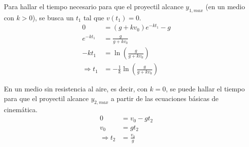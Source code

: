 


\vspace{5 mm}
Para hallar el tiempo necesario para que el proyectil alcance $y_{1,max}$ (en un medio con $k>0$), se busca un $t_{1}$ tal que $v(t_{1})=0$.
\begin{align*}
    0 &= (g+kv_{0})e^{-kt_{1}}-g \\
    e^{-kt_{1}} &= \frac{g}{g+kv_{0}} \\
    -kt_{1} &= \ln \left(\frac{g}{g+kv_{0}}\right) \\
    \Rightarrow t_{1} &= -\frac{1}{k} \ln \left(\frac{g}{g+kv_{0}}\right)
\end{align*}

\vspace{5 mm}
En un medio sin resistencia al aire, es decir, con $k=0$, se puede hallar el tiempo para que el proyectil alcance 
$y_{2,max}$ a partir de las ecuaciones básicas de cinemática.
\begin{align*}
    0 &= v_{0} -gt_{2} \\
    v_{0} &= gt_{2} \\
    \Rightarrow t_{2} &= \frac{v_{0}}{g}
\end{align*}

